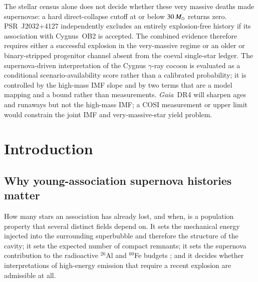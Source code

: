 \documentclass{aa}
\begin{document}
{The stellar census alone does not decide whether these very massive deaths made
supernovae: a hard direct-collapse cutoff at or below $30\,M_\odot$
returns zero. PSR~J2032+4127 independently excludes an entirely explosion-free
history if its association with Cygnus~OB2 is accepted. The combined evidence
therefore requires either a successful explosion in the very-massive regime or
an older or binary-stripped progenitor channel absent from the coeval
single-star ledger. The
supernova-driven interpretation of the Cygnus $\gamma$-ray cocoon is evaluated
as a conditional scenario-availability score rather than a calibrated
probability; it is controlled by the high-mass IMF slope and by two terms that
are a model mapping and a bound rather than measurements. \textit{Gaia}~DR4 will
sharpen ages and runaways but not the high-mass IMF; a COSI measurement or upper
limit would constrain the joint IMF and very-massive-star yield problem.}


\maketitle

\section{Introduction}\label{sec:intro}

\subsection{Why young-association supernova histories matter}

How many stars an association has already lost, and when, is a population
property that several distinct fields depend on. It sets the mechanical energy
injected into the surrounding superbubble and therefore the structure of the
cavity; it sets the expected number of compact remnants; it sets the supernova
contribution to the radioactive $^{26}$Al and $^{60}$Fe budgets
\citep{knodlseder2002, martin2010}; and it decides whether interpretations of
high-energy emission that require a recent explosion are admissible at all.
\end{document}
